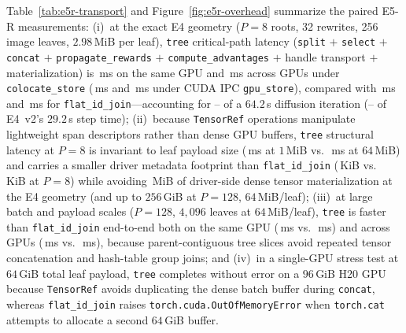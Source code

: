 \documentclass[10pt]{article}
\begin{document}
Table~\ref{tab:e5r-transport} and Figure~\ref{fig:e5r-overhead} summarize the paired E5-R measurements:
(i)~at the exact E4 geometry ($P=8$ roots, 32 rewrites, 256 image leaves, $2.98$\,MiB per leaf), \texttt{tree} critical-path latency (\texttt{split} $+$ \texttt{select} $+$ \texttt{concat} $+$ \texttt{propagate\_rewards} $+$ \texttt{compute\_advantages} $+$ handle transport $+$ materialization) is \EFiveRTreeEExactSameTotalMs{}\,ms on the same GPU and \EFiveRTreeEExactCrossTotalMs{}\,ms across GPUs under \texttt{colocate\_store} (\EFiveRTreeEExactIPCSameTotalMs{}\,ms and \EFiveRTreeEExactIPCCrossTotalMs{}\,ms under CUDA IPC \texttt{gpu\_store}), compared with \EFiveRFlatEExactSameTotalMs{}\,ms and \EFiveRFlatEExactCrossTotalMs{}\,ms for \texttt{flat\_id\_join}---accounting for \EFiveRTreeEExactPctSixtyFour{}--\EFiveRTreeEExactCrossPctSixtyFour{} of a $64.2$\,s diffusion iteration (\EFiveRTreeEExactPctTwentyNine{}--\EFiveRTreeEExactCrossPctTwentyNine{} of E4~v2's $29.2$\,s step time);
(ii)~because \texttt{TensorRef} operations manipulate lightweight span descriptors rather than dense GPU buffers, \texttt{tree} structural latency at $P=8$ is invariant to leaf payload size (\EFiveRTreePEightPOneStructMs{}\,ms at $1$\,MiB vs.\ \EFiveRTreePEightPSixFourStructMs{}\,ms at $64$\,MiB) and carries a smaller driver metadata footprint than \texttt{flat\_id\_join} (\EFiveRTreeEExactMetaKiB{}\,KiB vs.\ \EFiveRFlatEExactMetaKiB{}\,KiB at $P=8$) while avoiding \EFiveRTreeEExactAvoidedMiB{}\,MiB of driver-side dense tensor materialization at the E4 geometry (and up to $256$\,GiB at $P=128$, $64$\,MiB/leaf);
(iii)~at large batch and payload scales ($P=128$, $4{,}096$ leaves at $64$\,MiB/leaf), \texttt{tree} is faster than \texttt{flat\_id\_join} end-to-end both on the same GPU (\EFiveRTreePOneTwoEightPSixFourSameTotalMs{}\,ms vs.\ \EFiveRFlatPOneTwoEightPSixFourSameTotalMs{}\,ms) and across GPUs (\EFiveRTreePOneTwoEightPSixFourCrossTotalMs{}\,ms vs.\ \EFiveRFlatPOneTwoEightPSixFourCrossTotalMs{}\,ms), because parent-contiguous tree slices avoid repeated tensor concatenation and hash-table group joins; and
(iv)~in a single-GPU stress test at $64$\,GiB total leaf payload, \texttt{tree} completes without error on a $96$\,GiB H20 GPU because \texttt{TensorRef} avoids duplicating the dense batch buffer during \texttt{concat}, whereas \texttt{flat\_id\_join} raises \texttt{torch.cuda.OutOfMemoryError} when \texttt{torch.cat} attempts to allocate a second $64$\,GiB buffer.

\begin{table}[H]
\caption{Paired GPU trajectory-IR representation and transport benchmark (E5-R, median milliseconds over 100 repetitions per cell on NVIDIA H20 GPUs). ``Credit+Adv'' sums leaf-to-root reward propagation and group-advantage computation under both scopes; ``Transport+Mat'' sums handle localization and tensor materialization.}
\label{tab:e5r-transport}
\centering
\scriptsize
\resizebox{\textwidth}{!}{%
%
}
\end{table}
\end{document}
